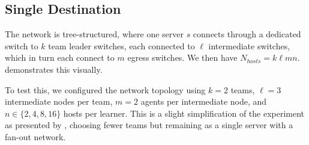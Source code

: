 \documentclass[10pt, times, conference, letterpaper]{IEEEtran}
\newcommand{\wvec}[1]{\ensuremath{\bm{w}_{#1}}}
\begin{document}
\subsection{Single Destination}\label{sec:single-dest}
The network is tree-structured, where one server $s$ connects through a dedicated switch to $k$ team leader switches, each connected to $\ell$ intermediate switches, which in turn each connect to $m$ egress switches.
We then have $N_{\mathit{hosts}} = k \ell m n$.
 demonstrates this visually.


To test this, we configured the network topology using $k=2$ teams, $\ell=3$ intermediate nodes per team, $m=2$ agents per intermediate node, and $n \in \{2, 4, 8, 16\}$ hosts per learner.
This is a slight simplification of the  experiment as presented by \textcite{DBLP:journals/eaai/MalialisK15}, choosing fewer teams but remaining as a single server with a fan-out network.
\end{document}
